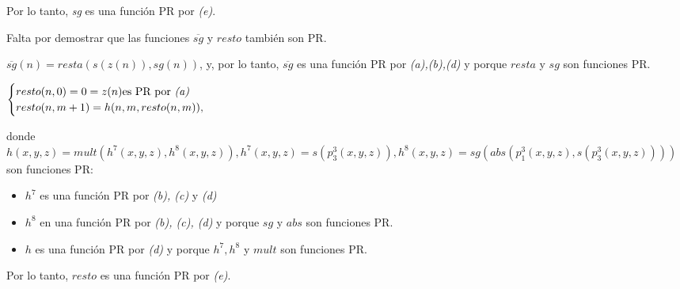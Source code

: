 \documentclass[a4paper,12pt]{article}
\begin{document}
Por lo tanto, \textit{sg} es una función PR por \textit{(e)}.


Falta por demostrar que las funciones $\overline{sg}$ y $resto$ también son PR.

$\overline{sg}(n) = resta(s(z(n)), sg(n))$, y, por lo tanto, $\overline{sg}$ es una función PR por \textit{(a),(b),(d)} y porque $resta$ y $sg$ son funciones PR.

    $\begin{cases}
    resto(n,0) = 0 = z(n) \mbox{es PR por \textit{(a)}}\\
    resto(n,m+1) = h(n,m,resto(n,m)),
    \end{cases}$
    
donde $h(x,y,z) = mult(h^{7}(x,y,z),h^{8}(x,y,z)), h^{7}(x,y,z) = s(p^{3}_{3}(x,y,z)), h^{8}(x,y,z) = sg(abs(p^{3}_{1}(x,y,z),s(p^{3}_{3}(x,y,z))))$ son funciones PR:

\begin{itemize}
    \item $h^{7}$ es una función PR por \textit{(b), (c)} y \textit{(d)}
    \item $h^{8}$ en una función PR por \textit{(b), (c), (d)} y porque $sg$ y $abs$ son funciones PR.
    \item $h$ es una función PR por \textit{(d)} y porque $h^{7}, h^{8}$ y $mult$ son funciones PR.
\end{itemize}

Por lo tanto, $resto$ es una función PR por \textit{(e)}.
\end{document}
